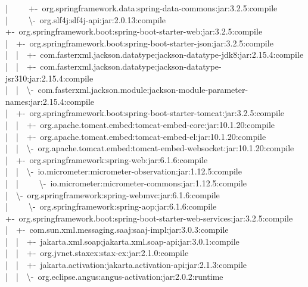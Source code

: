 \documentclass[
    paper=a4,
    twoside=false,
    parskip=half,
    listof=entryprefix,
    listof=totoc,
    index=totoc,
    bibliography=totoc,
    headsepline,
]{scrbook}
\begin{document}
    |~~~~~+-~org.springframework.data:spring-data-commons:jar:3.2.5:compile\\
    |~~~~~\textbackslash-~org.slf4j:slf4j-api:jar:2.0.13:compile\\
    +-~org.springframework.boot:spring-boot-starter-web:jar:3.2.5:compile\\
    |~~+-~org.springframework.boot:spring-boot-starter-json:jar:3.2.5:compile\\
    |~~|~~+-~com.fasterxml.jackson.datatype:jackson-datatype-jdk8:jar:2.15.4:compile\\
    |~~|~~+-~com.fasterxml.jackson.datatype:jackson-datatype-jsr310:jar:2.15.4:compile\\
    |~~|~~\textbackslash-~com.fasterxml.jackson.module:jackson-module-parameter-names:jar:2.15.4:compile\\
    |~~+-~org.springframework.boot:spring-boot-starter-tomcat:jar:3.2.5:compile\\
    |~~|~~+-~org.apache.tomcat.embed:tomcat-embed-core:jar:10.1.20:compile\\
    |~~|~~+-~org.apache.tomcat.embed:tomcat-embed-el:jar:10.1.20:compile\\
    |~~|~~\textbackslash-~org.apache.tomcat.embed:tomcat-embed-websocket:jar:10.1.20:compile\\
    |~~+-~org.springframework:spring-web:jar:6.1.6:compile\\
    |~~|~~\textbackslash-~io.micrometer:micrometer-observation:jar:1.12.5:compile\\
    |~~|~~~~~\textbackslash-~io.micrometer:micrometer-commons:jar:1.12.5:compile\\
    |~~\textbackslash-~org.springframework:spring-webmvc:jar:6.1.6:compile\\
    |~~~~~\textbackslash-~org.springframework:spring-aop:jar:6.1.6:compile\\
    +-~org.springframework.boot:spring-boot-starter-web-services:jar:3.2.5:compile\\
    |~~+-~com.sun.xml.messaging.saaj:saaj-impl:jar:3.0.3:compile\\
    |~~|~~+-~jakarta.xml.soap:jakarta.xml.soap-api:jar:3.0.1:compile\\
    |~~|~~+-~org.jvnet.staxex:stax-ex:jar:2.1.0:compile\\
    |~~|~~+-~jakarta.activation:jakarta.activation-api:jar:2.1.3:compile\\
    |~~|~~\textbackslash-~org.eclipse.angus:angus-activation:jar:2.0.2:runtime\\
\end{document}
